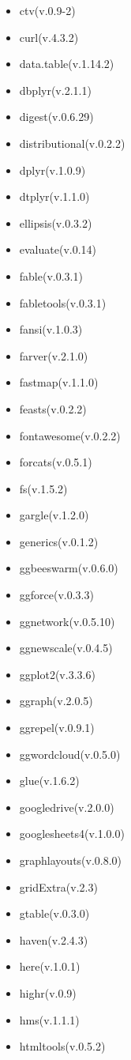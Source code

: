 \documentclass[
]{article}
\begin{document}
\begin{itemize}
\item
  ctv(v.0.9-2)
\item
  curl(v.4.3.2)
\item
  data.table(v.1.14.2)
\item
  dbplyr(v.2.1.1)
\item
  digest(v.0.6.29)
\item
  distributional(v.0.2.2)
\item
  dplyr(v.1.0.9)
\item
  dtplyr(v.1.1.0)
\item
  ellipsis(v.0.3.2)
\item
  evaluate(v.0.14)
\item
  fable(v.0.3.1)
\item
  fabletools(v.0.3.1)
\item
  fansi(v.1.0.3)
\item
  farver(v.2.1.0)
\item
  fastmap(v.1.1.0)
\item
  feasts(v.0.2.2)
\item
  fontawesome(v.0.2.2)
\item
  forcats(v.0.5.1)
\item
  fs(v.1.5.2)
\item
  gargle(v.1.2.0)
\item
  generics(v.0.1.2)
\item
  ggbeeswarm(v.0.6.0)
\item
  ggforce(v.0.3.3)
\item
  ggnetwork(v.0.5.10)
\item
  ggnewscale(v.0.4.5)
\item
  ggplot2(v.3.3.6)
\item
  ggraph(v.2.0.5)
\item
  ggrepel(v.0.9.1)
\item
  ggwordcloud(v.0.5.0)
\item
  glue(v.1.6.2)
\item
  googledrive(v.2.0.0)
\item
  googlesheets4(v.1.0.0)
\item
  graphlayouts(v.0.8.0)
\item
  gridExtra(v.2.3)
\item
  gtable(v.0.3.0)
\item
  haven(v.2.4.3)
\item
  here(v.1.0.1)
\item
  highr(v.0.9)
\item
  hms(v.1.1.1)
\item
  htmltools(v.0.5.2)

\end{itemize}
\end{document}

